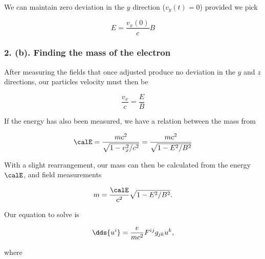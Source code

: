 {We can maintain zero deviation in the \(y\) direction (\(v_y(t) = 0\)) provided we pick

\begin{equation}\label{eqn:relElectroDynProblemSet2:410}
E = \frac{v_x(0)}{c} B
\end{equation}

\subsubsection{2. (b). Finding the mass of the electron}

After measuring the fields that once adjusted produce no deviation in the \(y\) and \(z\) directions, our particles velocity must then be

\begin{equation}\label{eqn:relElectroDynProblemSet2:430}
\frac{v_x}{c} = \frac{E}{B}
\end{equation}

If the energy has also been measured, we have a relation between the mass from

\begin{equation}\label{eqn:relElectroDynProblemSet2:450}
\calE = \frac{m c^2}{\sqrt{1 - v_x^2/c^2}} = \frac{ m c^2 }{ \sqrt{ 1 - E^2/B^2 }}
\end{equation}

With a slight rearrangement, our mass can then be calculated from the energy \(\calE\), and field measurements

\begin{equation}\label{eqn:relElectroDynProblemSet2:470}
m = \frac{ \calE }{c^2} \sqrt{ 1 - E^2/B^2 }.
\end{equation}



Our equation to solve is

\begin{equation}\label{eqn:relElectroDynProblemSet2:490}
\dds{u^i} = \frac{e}{m c^2} F^{ij} g_{jk} u^k,
\end{equation}

where

}
